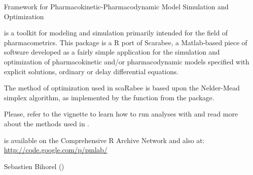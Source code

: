 %
\begin{Description}\relax
Framework for Pharmacokinetic-Pharmacodynamic Model Simulation and 
Optimization
\end{Description}
%
\begin{Details}\relax

 is a toolkit for modeling and simulation primarily intended for
the field of pharmacometrics. This package is a R port of Scarabee, a 
Matlab-based piece of software developed as a fairly simple application for the
simulation and optimization of pharmacokinetic and/or pharmacodynamic models 
specified with explicit solutions, ordinary or delay differential equations.

The method of optimization used in scaRabee is based upon the Nelder-Mead simplex
algorithm, as implemented by the  function from the
 package.

Please, refer to the vignette to learn how to run analyses with  
and read more about the methods used in .

 is  available on the Comprehensive R Archive Network and also at:
\url{http://code.google.com/p/pmlab/}

\end{Details}
%
\begin{Author}\relax
Sebastien Bihorel ()
\end{Author}
%
\begin{SeeAlso}\relax
{}
\end{SeeAlso}
